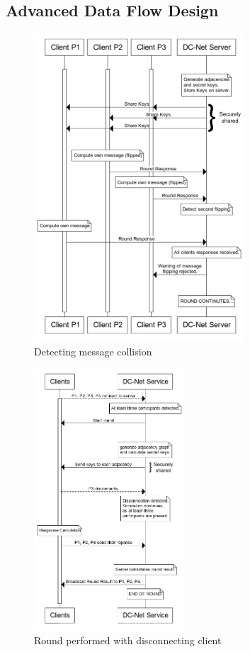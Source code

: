\subsection{Advanced Data Flow Design}


\begin{figure}[H]
    \centering
    \includegraphics[width=0.7\textwidth]{Images/Design/collisionDetection.png}
    \caption{Detecting message collision}
    \label{fig:collisionDetection}
\end{figure}

\begin{figure}[H]
    \centering
    \includegraphics[width=0.5\textwidth]{Images/Design/roundWithDisconnections.png}
    \caption{Round performed with disconnecting client}
    \label{fig:roundWithDisconnections}
\end{figure}

